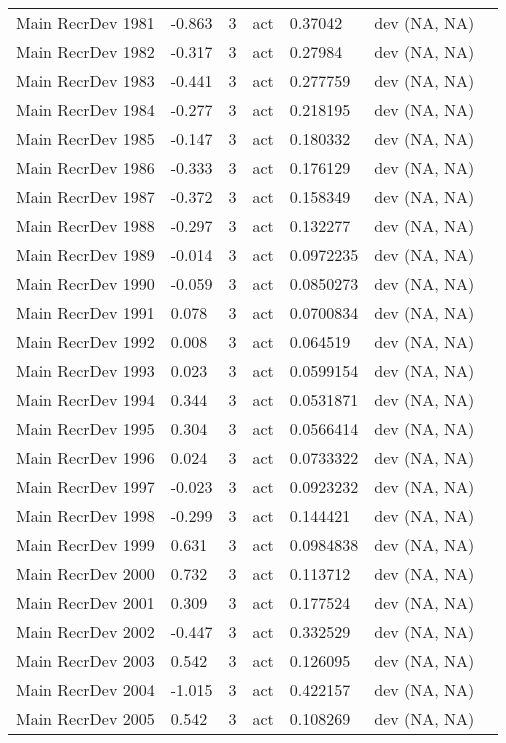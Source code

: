 \documentclass[11pt,
  english,
  letterpaper,
]{article}
\begin{document}
\begin{landscape}
\begin{longtable}[t]{>{\raggedright\arraybackslash}p{6cm}lllll>{\raggedright\arraybackslash}p{4cm}}
Main RecrDev 1981 & -0.863 & 3 & act & 0.37042 & dev (NA, NA)\\
Main RecrDev 1982 & -0.317 & 3 & act & 0.27984 & dev (NA, NA)\\
Main RecrDev 1983 & -0.441 & 3 & act & 0.277759 & dev (NA, NA)\\
Main RecrDev 1984 & -0.277 & 3 & act & 0.218195 & dev (NA, NA)\\
Main RecrDev 1985 & -0.147 & 3 & act & 0.180332 & dev (NA, NA)\\
Main RecrDev 1986 & -0.333 & 3 & act & 0.176129 & dev (NA, NA)\\
Main RecrDev 1987 & -0.372 & 3 & act & 0.158349 & dev (NA, NA)\\
Main RecrDev 1988 & -0.297 & 3 & act & 0.132277 & dev (NA, NA)\\
Main RecrDev 1989 & -0.014 & 3 & act & 0.0972235 & dev (NA, NA)\\
Main RecrDev 1990 & -0.059 & 3 & act & 0.0850273 & dev (NA, NA)\\
Main RecrDev 1991 & 0.078 & 3 & act & 0.0700834 & dev (NA, NA)\\
Main RecrDev 1992 & 0.008 & 3 & act & 0.064519 & dev (NA, NA)\\
Main RecrDev 1993 & 0.023 & 3 & act & 0.0599154 & dev (NA, NA)\\
Main RecrDev 1994 & 0.344 & 3 & act & 0.0531871 & dev (NA, NA)\\
Main RecrDev 1995 & 0.304 & 3 & act & 0.0566414 & dev (NA, NA)\\
Main RecrDev 1996 & 0.024 & 3 & act & 0.0733322 & dev (NA, NA)\\
Main RecrDev 1997 & -0.023 & 3 & act & 0.0923232 & dev (NA, NA)\\
Main RecrDev 1998 & -0.299 & 3 & act & 0.144421 & dev (NA, NA)\\
Main RecrDev 1999 & 0.631 & 3 & act & 0.0984838 & dev (NA, NA)\\
Main RecrDev 2000 & 0.732 & 3 & act & 0.113712 & dev (NA, NA)\\
Main RecrDev 2001 & 0.309 & 3 & act & 0.177524 & dev (NA, NA)\\
Main RecrDev 2002 & -0.447 & 3 & act & 0.332529 & dev (NA, NA)\\
Main RecrDev 2003 & 0.542 & 3 & act & 0.126095 & dev (NA, NA)\\
Main RecrDev 2004 & -1.015 & 3 & act & 0.422157 & dev (NA, NA)\\
Main RecrDev 2005 & 0.542 & 3 & act & 0.108269 & dev (NA, NA)\\

\end{longtable}
\end{landscape}
\end{document}
